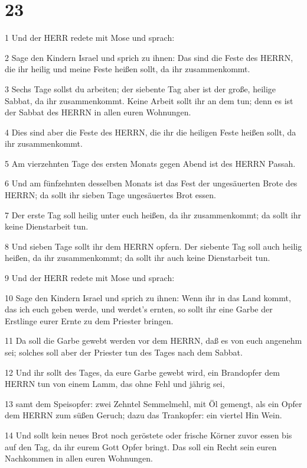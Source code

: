 \chapter{23}

\par 1 Und der HERR redete mit Mose und sprach:
\par 2 Sage den Kindern Israel und sprich zu ihnen: Das sind die Feste des HERRN, die ihr heilig und meine Feste heißen sollt, da ihr zusammenkommt.
\par 3 Sechs Tage sollst du arbeiten; der siebente Tag aber ist der große, heilige Sabbat, da ihr zusammenkommt. Keine Arbeit sollt ihr an dem tun; denn es ist der Sabbat des HERRN in allen euren Wohnungen.
\par 4 Dies sind aber die Feste des HERRN, die ihr die heiligen Feste heißen sollt, da ihr zusammenkommt.
\par 5 Am vierzehnten Tage des ersten Monats gegen Abend ist des HERRN Passah.
\par 6 Und am fünfzehnten desselben Monats ist das Fest der ungesäuerten Brote des HERRN; da sollt ihr sieben Tage ungesäuertes Brot essen.
\par 7 Der erste Tag soll heilig unter euch heißen, da ihr zusammenkommt; da sollt ihr keine Dienstarbeit tun.
\par 8 Und sieben Tage sollt ihr dem HERRN opfern. Der siebente Tag soll auch heilig heißen, da ihr zusammenkommt; da sollt ihr auch keine Dienstarbeit tun.
\par 9 Und der HERR redete mit Mose und sprach:
\par 10 Sage den Kindern Israel und sprich zu ihnen: Wenn ihr in das Land kommt, das ich euch geben werde, und werdet's ernten, so sollt ihr eine Garbe der Erstlinge eurer Ernte zu dem Priester bringen.
\par 11 Da soll die Garbe gewebt werden vor dem HERRN, daß es von euch angenehm sei; solches soll aber der Priester tun des Tages nach dem Sabbat.
\par 12 Und ihr sollt des Tages, da eure Garbe gewebt wird, ein Brandopfer dem HERRN tun von einem Lamm, das ohne Fehl und jährig sei,
\par 13 samt dem Speisopfer: zwei Zehntel Semmelmehl, mit Öl gemengt, als ein Opfer dem HERRN zum süßen Geruch; dazu das Trankopfer: ein viertel Hin Wein.
\par 14 Und sollt kein neues Brot noch geröstete oder frische Körner zuvor essen bis auf den Tag, da ihr eurem Gott Opfer bringt. Das soll ein Recht sein euren Nachkommen in allen euren Wohnungen.
